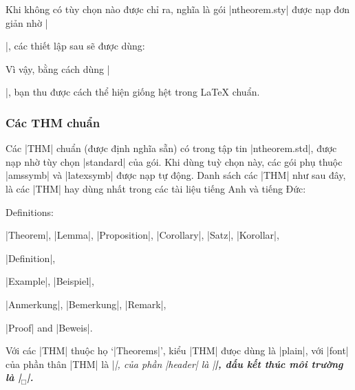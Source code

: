 Khi không có tùy chọn nào được chỉ ra, nghĩa là gói |ntheorem.sty|
được nạp đơn giản nhờ |\usepackage{ntheorem}|, các thiết lập sau
sẽ được dùng:
\begin{example} 
  \theoremstyle{plain}
  \theoremheaderfont{\normalfont\bfseries}
  \theorembodyfont{\itshape}
  \theoremseparator{}
  \theoremsymbol{}
\end{example}
Vì vậy, bằng cách dùng |\newtheorem{...}{...}|, bạn thu được
cách thể hiện giống hệt trong \LaTeX{} chuẩn.

\subsubsection{\texorpdfstring{Các THM chuẩn}{Cac THM chuan}}
\label{sec:standard}

Các |THM| chuẩn (được định nghĩa sẵn) có trong tập tin |ntheorem.std|,
được nạp nhờ tùy chọn |standard| của gói. Khi dùng tuỳ chọn này,
các gói phụ thuộc |amssymb| và |latexsymb| được nạp tự động.
Danh sách các |THM| như sau đây, là các |THM| hay dùng nhất
trong các tài liệu tiếng Anh và tiếng Đức:
\begin{nlist}{Definitions:}
 \item[Theorems:]  |Theorem|, |Lemma|, |Proposition|,
  |Corollary|, |Satz|, |Korollar|,
 \item[Definitions:] |Definition|,
 \item[Examples:] |Example|, |Beispiel|,
 \item[Remarks:] |Anmerkung|, |Bemerkung|, |Remark|,
 \item[Proofs:] |Proof| and |Beweis|.
\end{nlist}

Với các |THM| thuộc họ `|Theorems|', kiểu |THM| đưọc dùng là |plain|,
với |font| của phần thân |THM| là |\itshape|, của phần |header|
là |\bfseries|, dấu kết thúc môi trường là |\ensuremath{_\Box}|.

